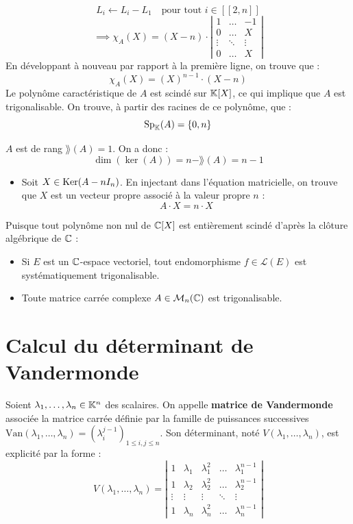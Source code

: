 \documentclass[12pt, a4paper]{report}
\begin{document}
\begin{example}
        $$L_i \leftarrow L_i - L_1 \quad \text{pour tout } i \in [\![2,n]\!]$$
    $$\implies \chi_A(X) = (X-n) \cdot \left|\begin{matrix} 1 & \dots & -1 \\ 0 & \dots & X \\ \vdots & \ddots & \vdots \\ 0 & \dots & X \end{matrix}\right|$$
    En développant à nouveau par rapport à la première ligne, on trouve que :
    $$\chi_A(X) = (X)^{n-1} \cdot (X - n)$$
    Le polynôme caractéristique de $A$ est scindé sur $\mathbb{K}[X]$, ce qui implique que $A$ est trigonalisable. On trouve, à partir des racines de ce polynôme, que :
    $$\mathrm{Sp}_{\mathbb{K}}(A) = \{0, n\}$$

    $A$ est de rang $\rang(A) = 1$. On a donc :
    $$\dim(\ker(A)) = n - \rang(A) = n - 1$$
    \begin{itemize}
        \item Soit $X \in \mathrm{Ker}(A - nI_n)$. En injectant dans l'équation matricielle, on trouve que $X$ est un vecteur propre associé à la valeur propre $n$ :
        $$A \cdot X = n \cdot X$$
    \end{itemize}
\end{example}

\begin{consequence}
    Puisque tout polynôme non nul de $\mathbb{C}[X]$ est entièrement scindé d'après la clôture algébrique de $\mathbb{C}$ :
    \begin{itemize}
        \item Si $E$ est un $\mathbb{C}$-espace vectoriel, tout endomorphisme $f \in \mathcal{L}(E)$ est systématiquement trigonalisable.
        \item Toute matrice carrée complexe $A \in \mathcal{M}_n(\mathbb{C})$ est trigonalisable.
    \end{itemize}
\end{consequence}


\section{Calcul du déterminant de Vandermonde}

\begin{definition}
    Soient $\lambda_1, \dots, \lambda_n \in \mathbb{K}^n$ des scalaires. On appelle \textbf{matrice de Vandermonde} associée la matrice carrée définie par la famille de puissances successives $\text{Van}(\lambda_1, \dots, \lambda_n) = (\lambda_i^{j-1})_{1 \le i,j \le n}$.
    Son déterminant, noté $V(\lambda_1, \dots, \lambda_n)$, est explicité par la forme :
    $$V(\lambda_1, \dots, \lambda_n) = \left|\begin{matrix} 
        1 & \lambda_1 & \lambda_1^2 & \dots & \lambda_1^{n-1} \\
        1 & \lambda_2 & \lambda_2^2 & \dots & \lambda_2^{n-1} \\
        \vdots & \vdots & \vdots & \ddots & \vdots \\
        1 & \lambda_n & \lambda_n^2 & \dots & \lambda_n^{n-1}
    \end{matrix}\right|$$
\end{definition}
\end{document}
